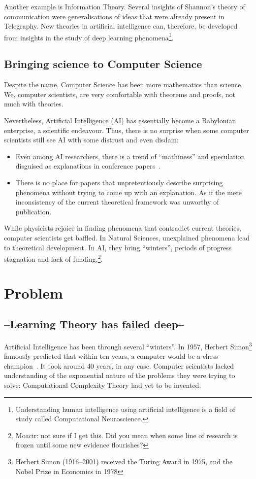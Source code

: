 Another example is Information Theory. Several insights of Shannon's theory of communication were generalisations of ideas that were already present in Telegraphy. New theories in artificial intelligence can, therefore,  be developed from insights in the study of deep learning phenomena\footnote{Understanding human intelligence using artificial intelligence is a field of study called Computational Neuroscience.}.


\subsection{Bringing science to Computer Science} Despite the name, Computer Science has been more mathematics than science. We, computer scientists, are very comfortable with theorems and proofs, not much with theories.

Nevertheless, Artificial Intelligence (AI) has essentially become a Babylonian enterprise, a scientific endeavour. Thus, there is no surprise when some computer scientists still see AI with some distrust and even disdain:
\begin{itemize}
	\item Even among AI researchers, there is a trend of ``mathiness'' and speculation disguised as explanations in conference papers~\cite{lipton:2018}.
	\item There is no place for papers that unpretentiously describe surprising phenomena without trying to come up with an explanation. As if the mere inconsistency of the current theoretical framework was unworthy of publication.
\end{itemize}

While physicists rejoice in finding phenomena that contradict current theories, computer scientists get baffled. In Natural Sciences, unexplained phenomena lead to theoretical development. In AI, they bring ``winters'', periods of progress stagnation and lack of funding.\footnote{Moacir: not sure if I get this. Did you mean when some line of research is frozen until some new evidence flourishes?}.


\section{Problem}

\subsection{--Learning Theory has failed deep--} Artificial Intelligence has been through several ``winters''.  In 1957, Herbert Simon\footnote{Herbert Simon (1916--2001) received the Turing Award in 1975, and the Nobel Prize in Economics in 1978} famously predicted that within ten years, a computer would be a chess champion~\cite[section 1.3]{russell:2010}. It took around 40 years, in any case. Computer scientists lacked understanding of the exponential nature of the problems they were trying to solve: Computational Complexity Theory had yet to be invented.

